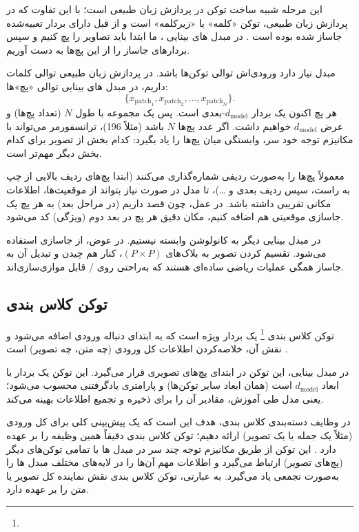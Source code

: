 این مرحله شبیه ساخت توکن در پردازش زبان طبیعی است؛ با این تفاوت که در پردازش زبان طبیعی، توکن «کلمه» یا «زیرکلمه» است و از قبل دارای بردار تعبیه‌شده جاساز شده بوده است \cite{vaswani2017attention}. در مبدل های بینایی \cite{dosovitskiy2020image}، ما ابتدا باید تصاویر را پچ کنیم و سپس بردارهای  جاساز را از این پچ‌ها به دست آوریم.

مبدل نیاز دارد ورودی‌اش توالی توکن‌ها باشد. در پردازش زبان طبیعی توالی کلمات داریم، در مبدل های بینایی توالی «پچ»‌ها:
\[
\{ x_{\text{patch}_1}, x_{\text{patch}_2}, \dots, x_{\text{patch}_N} \}.
\]
هر پچ اکنون یک بردار \(d_{\text{model}}\)-بعدی است. پس یک مجموعه با طول \(N\) (تعداد پچ‌ها) و عرض \(d_{\text{model}}\) خواهیم داشت.  
اگر عدد پچ‌ها \(N\) باشد (مثلاً 196)، ترانسفورمر می‌تواند با مکانیزم توجه خود سر، وابستگی  میان پچ‌ها را یاد بگیرد: کدام بخش از تصویر برای کدام بخش دیگر مهم‌تر است\cite{vaswani2017attention,dosovitskiy2020image}.

معمولاً پچ‌ها را به‌صورت ردیفی شماره‌گذاری می‌کنند (ابتدا پچ‌های ردیف بالایی از چپ به راست، سپس ردیف بعدی و …)، تا مدل در صورت نیاز بتواند از موقعیت‌ها، اطلاعات مکانی تقریبی داشته باشد.  
در عمل، چون قصد داریم (در مراحل بعد) به هر پچ یک جاسازی موقعیتی هم اضافه کنیم، مکان دقیق هر پچ در بعد  دوم (ویژگی) کد می‌شود.

در مبدل بینایی \cite{dosovitskiy2020image} دیگر به کانولوشن وابسته نیستیم. در عوض، از جاسازی استفاده می‌شود.  
تقسیم  کردن تصویر به بلاک‌های \((P \times P)\)، کنار هم چیدن و تبدیل آن به جاساز همگی عملیات ریاضی ساده‌ای هستند که به‌راحتی روی / قابل موازی‌سازی‌اند.

\subsection{توکن کلاس بندی}
توکن کلاس بندی \footnote{} یک بردار ویژه است که به ابتدای دنباله ورودی اضافه می‌شود و نقش آن، خلاصه‌کردن اطلاعات کل ورودی (چه متن، چه تصویر) است \cite{devlin2018bert,dosovitskiy2020image}.

در مبدل بینایی، این توکن در ابتدای پچ‌های تصویری قرار می‌گیرد.  
این توکن یک بردار با ابعاد \(d_{\text{model}}\) است (همان ابعاد سایر توکن‌ها) و پارامتری یادگرفتنی محسوب می‌شود؛ یعنی مدل طی آموزش، مقادیر آن را برای ذخیره و تجمیع اطلاعات بهینه می‌کند.

در وظایف دسته‌بندی کلاس بندی، هدف این است که یک پیش‌بینی کلی برای کل ورودی (مثلاً یک جمله یا یک تصویر) ارائه دهیم؛ توکن کلاس بندی دقیقاً همین وظیفه را بر عهده دارد \cite{devlin2018bert}. این توکن از طریق مکانیزم توجه چند سر در مبدل ها با تمامی توکن‌های دیگر (پچ‌های تصویر) ارتباط می‌گیرد و اطلاعات مهم آن‌ها را در لایه‌های مختلف مبدل ها را به‌صورت تجمعی یاد می‌گیرد. به عبارتی، توکن کلاس بندی نقش نماینده کل تصویر یا متن را بر عهده دارد.

